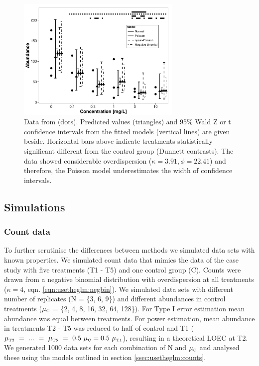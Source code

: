 \begin{figure}
  \centering
  \includegraphics[width = 0.7\textwidth]{chapters/usetheglm/example.pdf}
  \caption[Example data from Brock et al. (2015).]{Data from \citet{brock_minimum_2015} (dots). 
  Predicted values (triangles) and 95\% Wald Z or t confidence intervals from the fitted models (vertical lines) are given beside.
  Horizontal bars above indicate treatments statistically significant different from the control group (Dunnett contrasts).
  The data showed considerable overdispersion ($\kappa = 3.91, \phi = 22.41$) and therefore, the Poisson model underestimates the width of confidence intervals.
  }
  \label{fig:usetheglm:example}
\end{figure}


\subsection{Simulations}
\label{ssec:usetheglm:simulations}
\subsubsection{Count data}
To further scrutinise the differences between methods we simulated data sets with known properties.
We simulated count data that mimics the data of the case study with five treatments (T1 - T5) and one control group (C).
Counts were drawn from a negative binomial distribution with overdispersion at all treatments ($\kappa = 4$, eqn. \ref{eqn:usetheglm:negbin}).
We simulated data sets with different number of replicates (N = \{3, 6, 9\}) and different abundances in control treatments ($\mu_\text{\tiny C}$ = \{2, 4, 8, 16, 32, 64, 128\}). 
For Type I error estimation mean abundance was equal between treatments.
For power estimation, mean abundance in treatments T2 - T5 was reduced to half of control and T1 ($\mu_\text{\tiny T2}~=~...~=~\mu_\text{\tiny T5}~=~0.5~\mu_\text{\tiny C} = 0.5~\mu_\text{\tiny T1}$), resulting in a theoretical LOEC at T2.
We generated 1000 data sets for each combination of N and $\mu_\text{\tiny C}$ and analysed these using the models outlined in section \ref{ssec:usetheglm:counts}.


